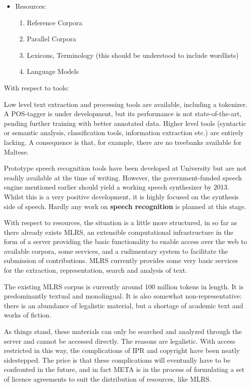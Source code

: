 \documentclass[]{../../metanetpaper}
\begin{document}
\begin{multicols}{2}
\begin{itemize}
\item Resources:
\begin{enumerate}
\item Reference Corpora
\item Parallel Corpora
\item Lexicons, Terminology (this should be understood to include wordlists)
\item Language Models
\end{enumerate}
\end{itemize}

With respect to tools:

Low level text extraction and processing tools are available, including a tokenizer. A POS-tagger is under development, but its performance is not state-of-the-art, pending further training with better annotated data. 
Higher level tools (syntactic or semantic analysis, classification tools, information extraction etc.) are entirely lacking. A consequence is that, for example, there are no treebanks available for Maltese.

Prototype speech recognition tools have been developed at University but are not readily available at the time of writing. However, the government-funded speech engine mentioned earlier should yield a working speech synthesizer by 2013. Whilst this is a very positive development, it is highly focused on the synthesis side of speech. Hardly any work on \textbf{speech recognition} is planned at this stage.

With respect to resources, the situation is a little more structured, in so far as there already exists MLRS, an extensible computational infrastructure in the form of a server providing the basic functionality to enable access over the web to available corpora, some services, and a rudimentary system to facilitate the submission of contributions. MLRS currently provides some very basic services for the extraction, representation, search and analysis of text.

The existing MLRS corpus is currently around 100 million tokens in length. It is predominantly textual and monolingual. It is also somewhat non-representative: there is an abundance of legalistic material, but a shortage of academic text and works of fiction.

As things stand, these materials can only be searched and analyzed through the server and cannot be accessed directly. The reasons are legalistic. With access restricted in this way, the complications of IPR and copyright have been neatly sidestepped. The price is that these complications will eventually have to be confronted in the future, and in fact META is in the process of formulating a set of licence agreements to suit the distribution of resources, like MLRS.



\end{multicols}
\end{document}
